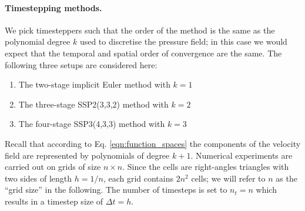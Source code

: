 \documentclass[11pt]{article}
\begin{document}
\paragraph{Timestepping methods.}
We pick timesteppers such that the order of the method is the same as the polynomial degree $k$ used to discretise the pressure field; in this case we would expect that the temporal and spatial order of convergence are the same. The following three setups are considered here:
\begin{enumerate}
    \item The two-stage implicit Euler method with $k=1$
    \item The three-stage SSP2(3,3,2) method with $k=2$
    \item The four-stage SSP3(4,3,3) method with $k=3$
\end{enumerate}
Recall that according to Eq. \eqref{eqn:function_spaces} the components of the velocity field are represented by polynomials of degree $k+1$. Numerical experiments are carried out on grids of size $n\times n$. Since the cells are right-angles triangles with two sides of length $h=1/n$, each grid contains $2n^2$ cells; we will refer to $n$ as the ``grid size'' in the following. The number of timesteps is set to $n_t=n$ which results in a timestep size of $\Delta t=h$.
\end{document}
